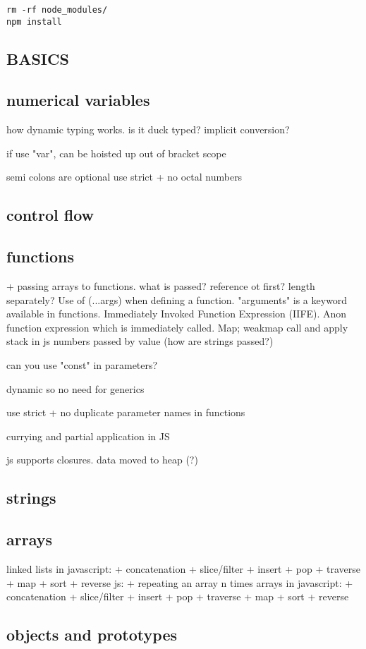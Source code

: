 \begin{verbatim}
rm -rf node_modules/
npm install
\end{verbatim}


\subsection{BASICS}
\subsection{numerical variables}
how dynamic typing works. is it duck typed? implicit conversion?

if use "var", can be hoisted up out of bracket scope

semi colons are optional
use strict
+ no octal numbers
\subsection{control flow}
\subsection{functions}
+ passing arrays to functions. what is passed? reference ot first? length separately?
Use of (...args) when defining a function.
"arguments" is a keyword available in functions.
Immediately Invoked Function Expression (IIFE). Anon function expression which is immediately called.
Map; weakmap
call and apply
stack in js
numbers passed by value
(how are strings passed?)

can you use "const" in parameters?

dynamic so no need for generics

use strict
+ no duplicate parameter names in functions

currying and partial application in JS

js supports closures. data moved to heap (?)
\subsection{strings}
\subsection{arrays}
linked lists in javascript:
+ concatenation
+ slice/filter
+ insert
+ pop
+ traverse
+ map
+ sort
+ reverse
js:
+ repeating an array n times
arrays in javascript:
+ concatenation
+ slice/filter
+ insert
+ pop
+ traverse
+ map
+ sort
+ reverse
\subsection{objects and prototypes}


